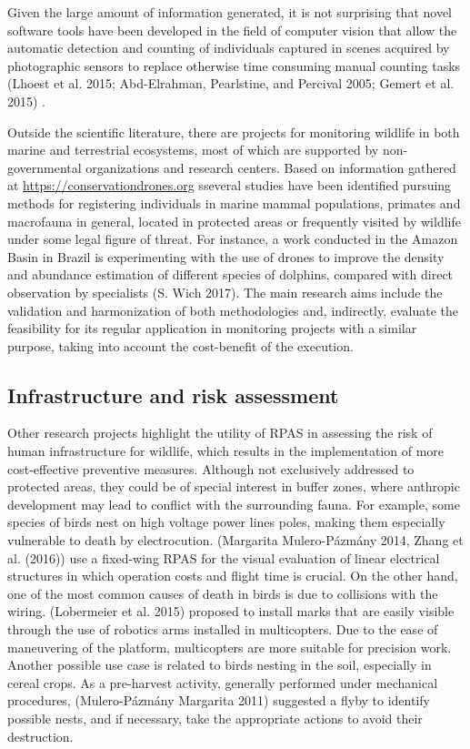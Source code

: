 \documentclass[]{interact}
\theoremstyle{plain}%
\theoremstyle{definition}
\theoremstyle{remark}
\begin{document}
Given the large amount of information generated, it is not surprising
that novel software tools have been developed in the field of computer
vision that allow the automatic detection and counting of individuals
captured in scenes acquired by photographic sensors to replace otherwise
time consuming manual counting tasks (Lhoest et al. 2015; Abd-Elrahman,
Pearlstine, and Percival 2005; Gemert et al. 2015) .

Outside the scientific literature, there are projects for monitoring
wildlife in both marine and terrestrial ecosystems, most of which are
supported by non-governmental organizations and research centers. Based
on information gathered at \url{https://conservationdrones.org} sseveral
studies have been identified pursuing methods for registering
individuals in marine mammal populations, primates and macrofauna in
general, located in protected areas or frequently visited by wildlife
under some legal figure of threat. For instance, a work conducted in the
Amazon Basin in Brazil is experimenting with the use of drones to
improve the density and abundance estimation of different species of
dolphins, compared with direct observation by specialists (S. Wich
2017). The main research aims include the validation and harmonization
of both methodologies and, indirectly, evaluate the feasibility for its
regular application in monitoring projects with a similar purpose,
taking into account the cost-benefit of the execution.



\subsection{Infrastructure and risk
assessment}\label{infrastructure-and-risk-assessment}

Other research projects highlight the utility of RPAS in assessing the
risk of human infrastructure for wildlife, which results in the
implementation of more cost-effective preventive measures. Although not
exclusively addressed to protected areas, they could be of special
interest in buffer zones, where anthropic development may lead to
conflict with the surrounding fauna. For example, some species of birds
nest on high voltage power lines poles, making them especially
vulnerable to death by electrocution. (Margarita Mulero-Pázmány 2014,
Zhang et al. (2016)) use a fixed-wing RPAS for the visual evaluation of
linear electrical structures in which operation costs and flight time is
crucial. On the other hand, one of the most common causes of death in
birds is due to collisions with the wiring. (Lobermeier et al. 2015)
proposed to install marks that are easily visible through the use of
robotics arms installed in multicopters. Due to the ease of maneuvering
of the platform, multicopters are more suitable for precision work.
Another possible use case is related to birds nesting in the soil,
especially in cereal crops. As a pre-harvest activity, generally
performed under mechanical procedures, (Mulero-Pázmány Margarita 2011)
suggested a flyby to identify possible nests, and if necessary, take the
appropriate actions to avoid their destruction.
\end{document}
